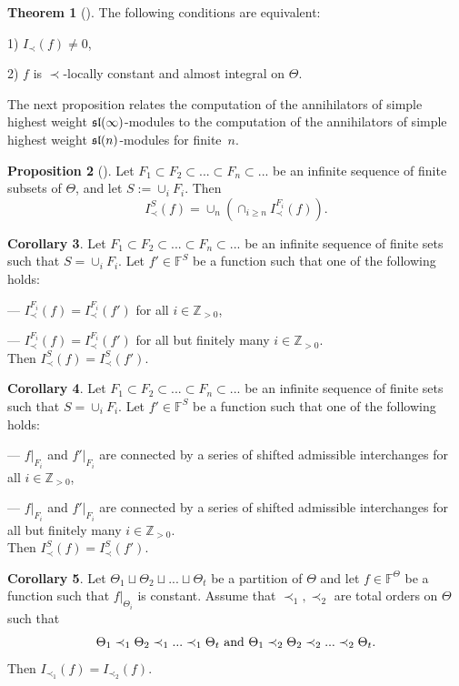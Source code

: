 \documentclass[10pt]{amsart}\oddsidemargin -1mm \evensidemargin -1mm \topmargin -15mm\headheight5mm \headsep 3.5mm \textheight 245mm\textwidth 170mm
\theoremstyle{definition}\newtheorem{theorem}{Theorem}[section]\newtheorem{lemma}[theorem]{Lemma}\newtheorem{remark}[theorem]{Remark}\newtheorem{proposition}[theorem]{Proposition}\newtheorem{corollary}[theorem]{Corollary}\newtheorem{definition}[theorem]{Definition}\newtheorem{Ex}[theorem]{Example}\newtheorem{obs}[theorem]{Observation}\newtheorem{nota}[theorem]{Notation}
\begin{document}
\begin{theorem}[{\cite[Theorem~9]{PP2}}] The following conditions are equivalent:

1) $I_\prec(f)\ne0$,

2) $f$ is $\prec$-locally constant and almost integral on $\Theta$.\end{theorem}

The next proposition relates the computation of the annihilators of simple highest weight $\frak{sl}(\infty)$-modules to the computation of the annihilators of simple highest weight $\frak{sl}(n)$-modules for finite~$n$. 

\begin{proposition}[{\cite[Lemma~5.7]{PP2}}]\label{Pfinf} Let $F_1\subset F_2\subset...\subset F_n\subset...$ be an infinite sequence of finite subsets of $\Theta$, and let $S:=\cup_i F_i$. Then
$$I^S_\prec(f)=\cup_n(\cap_{i\ge n}I^{F_i}_\prec(f)).$$\end{proposition}
\begin{corollary} Let $F_1\subset F_2\subset...\subset F_n\subset...$ be an infinite sequence of finite sets such that $S=\cup_i F_i$. Let $f'\in\mathbb F^S$ be a function such that one of the following holds:

--- $I^{F_i}_{\prec}(f)=I^{F_i}_{\prec}(f')$ for all $i\in\mathbb Z_{>0}$,

--- $I^{F_i}_{\prec}(f)=I^{F_i}_{\prec}(f')$ for all but finitely many $i\in\mathbb Z_{>0}$.\\
Then $I^S_\prec(f)=I^S_\prec(f')$.
\end{corollary}
\begin{corollary}\label{Cknu63} Let $F_1\subset F_2\subset...\subset F_n\subset...$ be an infinite sequence of finite sets such that $S=\cup_i F_i$. Let $f'\in\mathbb F^S$ be a function such that one of the following holds:

--- $f|_{F_i}$ and $f'|_{F_i}$ are connected by a series of shifted admissible interchanges for all $i\in\mathbb Z_{>0}$,

--- $f|_{F_i}$ and $f'|_{F_i}$ are connected by a series of shifted admissible interchanges for all but finitely many $i\in\mathbb Z_{>0}$.
\\
Then $I^S_\prec(f)=I^S_\prec(f')$.
\end{corollary}
\begin{corollary}\label{Crper} Let $\Theta_1\sqcup \Theta_2\sqcup...\sqcup \Theta_t$ be a partition of $\Theta$ and let $f\in\mathbb F^\Theta$ be a function such that $f|_{\Theta_i}$ is constant. Assume that $\prec_1, \prec_2$ are total orders on $\Theta$ such that
\begin{equation}\Theta_1\prec_1 \Theta_2\prec_1...\prec_1 \Theta_t{\rm~and~}\Theta_1\prec_2 \Theta_2\prec_2...\prec_2 \Theta_t.\label{Esucc}\end{equation}
Then $I_{\prec_1}(f)=I_{\prec_2}(f)$.\end{corollary}
\end{document}
